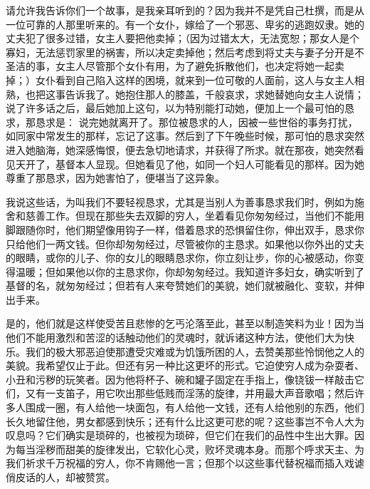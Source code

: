 请允许我告诉你们一个故事，是我亲耳听到的？因为我并不是凭自己杜撰，而是从一位可靠的人那里听来的。有一个女仆，嫁给了一个邪恶、卑劣的逃跑奴隶。她的丈夫犯了很多过错，女主人要把他卖掉；（因为过错太大，无法宽恕；那女人是个寡妇，无法惩罚家里的祸害，所以决定卖掉他；然后考虑到将丈夫与妻子分开是不圣洁的事，女主人尽管那个女仆有用，为了避免拆散他们，也决定将她一起卖掉；）女仆看到自己陷入这样的困境，就来到一位可敬的人面前，这人与女主人相熟，也把这事告诉我了。她抱住那人的膝盖，千般哀求，求她替她向女主人说情；说了许多话之后，最后她加上这句，以为特别能打动她，便加上一个最可怕的恳求，那恳求是： 说完她就离开了。那位被恳求的人，因被一些世俗的事务打扰，如同家中常发生的那样，忘记了这事。然后到了下午晚些时候，那可怕的恳求突然进入她脑海，她深感悔恨，便去急切地请求，并获得了所求。就在那夜，她突然看见天开了，基督本人显现。但她看见了他，如同一个妇人可能看见的那样。因为她尊重了那恳求，因为她害怕了，便堪当了这异象。\par

我说这些话，为叫我们不要轻视恳求，尤其是当别人为善事恳求我们时，例如为施舍和慈善工作。但现在那些失去双脚的穷人，坐着看见你匆匆经过，当他们不能用脚跟随你时，他们期望像用钩子一样，借着恳求的恐惧留住你，伸出双手，恳求你只给他们一两文钱。但你却匆匆经过，尽管被你的主恳求。如果他以你外出的丈夫的眼睛，或你的儿子、你的女儿的眼睛恳求你，你立刻让步，你的心被感动，你变得温暖；但如果他以你的主恳求你，你却匆匆经过。我知道许多妇女，确实听到了基督的名，就匆匆经过；但若有人来夸赞她们的美貌，她们就被融化、变软，并伸出手来。\par

是的，他们就是这样使受苦且悲惨的乞丐沦落至此，甚至以制造笑料为业！因为当他们不能用激烈和苦涩的话触动他们的灵魂时，就诉诸这种方法，使他们大为快乐。我们的极大邪恶迫使那遭受灾难或为饥饿所困的人，去赞美那些怜悯他之人的美貌。我希望仅止于此。但还有另一种比这更坏的形式。它迫使穷人成为杂耍者、小丑和污秽的玩笑者。因为他将杯子、碗和罐子固定在手指上，像铙钹一样敲击它们，又有一支笛子，用它吹出那些低贱而淫荡的旋律，并用最大声音歌唱；然后许多人围成一圈，有人给他一块面包，有人给他一文钱，还有人给他别的东西，他们长久地留住他，男女都感到快乐；还有什么比这更可悲的呢？这些事岂不令人大为叹息吗？它们确实是琐碎的，也被视为琐碎，但它们在我们的品性中生出大罪。因为每当淫秽而甜美的旋律发出，它软化心灵，败坏灵魂本身。而那个呼求天主、为我们祈求千万祝福的穷人，你不肯赐他一言；但那个以这些事代替祝福而插入戏谑俏皮话的人，却被赞赏。\par

